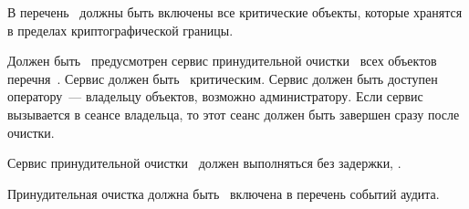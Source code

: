 \label{R.DE.Long}
В перечень~ должны быть включены все критические объекты, 
которые хранятся в пределах криптографической границы.

\label{R.DE.Service}
Должен быть~ предусмотрен сервис принудительной 
очистки~ всех объектов перечня~.
%
Сервис должен быть~ критическим.
%
Сервис должен быть доступен~ оператору~--- владельцу 
объектов, возможно администратору.
%
Если сервис вызывается в сеансе владельца, то этот сеанс должен быть 
завершен сразу после очистки.

\label{R.DE.Immediate}
Сервис принудительной очистки~ должен выполняться 
без задержки, .

\label{R.DE.AU}
Принудительная очистка должна быть~ включена в перечень 
событий аудита.

